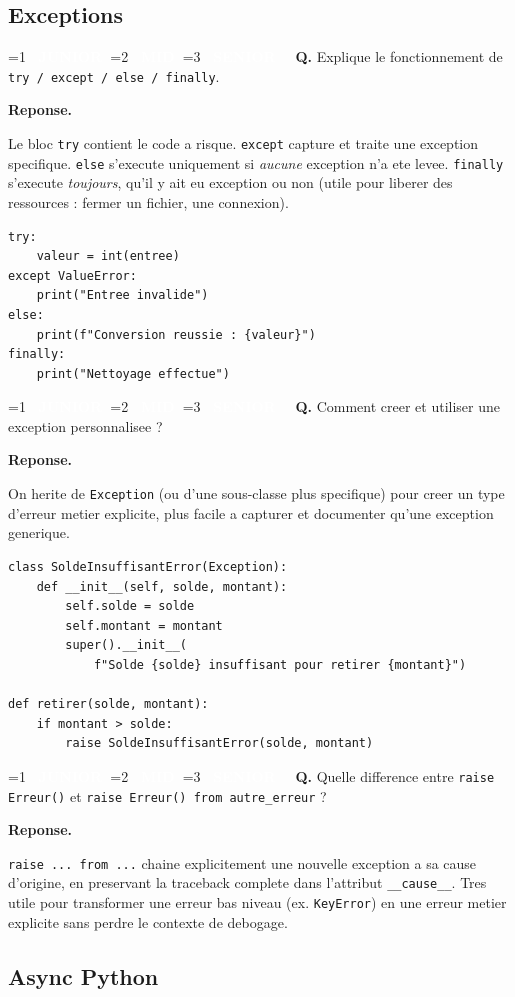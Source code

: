 \documentclass[11pt,a4paper]{article}
\newcommand{\badgeJ}{\textcolor{white}{\colorbox{junior}{\small\bfseries\ JUNIOR\ }}}
\newcommand{\badgeM}{\textcolor{white}{\colorbox{mid}{\small\bfseries\ MID\ }}}
\newcommand{\badgeS}{\textcolor{white}{\colorbox{senior}{\small\bfseries\ SENIOR\ }}}
\newcounter{qcount}
\newenvironment{qa}[2]{%
  \stepcounter{qcount}%
  \par\vspace{6pt}%
  \noindent\colorbox{qbg}{\parbox{\dimexpr\linewidth-12pt}{\vspace{2pt}%
  \ifnum#1=1 \badgeJ\fi\ifnum#1=2 \badgeM\fi\ifnum#1=3 \badgeS\fi
  \ \textbf{Q\theqcount.} #2\vspace{2pt}}}\par\vspace{4pt}%
  \noindent\textbf{\color{accent}Reponse.}\ \ignorespaces
}{%
  \par\vspace{8pt}%
}
\begin{document}
\subsection{Exceptions}

\begin{qa}{1}{Explique le fonctionnement de \texttt{try / except / else / finally}.}
Le bloc \texttt{try} contient le code a risque. \texttt{except} capture et
traite une exception specifique. \texttt{else} s'execute uniquement si
\emph{aucune} exception n'a ete levee. \texttt{finally} s'execute
\emph{toujours}, qu'il y ait eu exception ou non (utile pour liberer des
ressources : fermer un fichier, une connexion).
\begin{lstlisting}
try:
    valeur = int(entree)
except ValueError:
    print("Entree invalide")
else:
    print(f"Conversion reussie : {valeur}")
finally:
    print("Nettoyage effectue")
\end{lstlisting}
\end{qa}

\begin{qa}{2}{Comment creer et utiliser une exception personnalisee ?}
On herite de \texttt{Exception} (ou d'une sous-classe plus specifique) pour
creer un type d'erreur metier explicite, plus facile a capturer et documenter
qu'une exception generique.
\begin{lstlisting}
class SoldeInsuffisantError(Exception):
    def __init__(self, solde, montant):
        self.solde = solde
        self.montant = montant
        super().__init__(
            f"Solde {solde} insuffisant pour retirer {montant}")

def retirer(solde, montant):
    if montant > solde:
        raise SoldeInsuffisantError(solde, montant)
\end{lstlisting}
\end{qa}

\begin{qa}{2}{Quelle difference entre \texttt{raise Erreur()} et \texttt{raise Erreur() from autre\_erreur} ?}
\texttt{raise ... from ...} chaine explicitement une nouvelle exception a sa
cause d'origine, en preservant la traceback complete dans l'attribut
\texttt{\_\_cause\_\_}. Tres utile pour transformer une erreur bas niveau
(ex. \texttt{KeyError}) en une erreur metier explicite sans perdre le contexte
de debogage.
\end{qa}

\subsection{Async Python}
\end{document}
